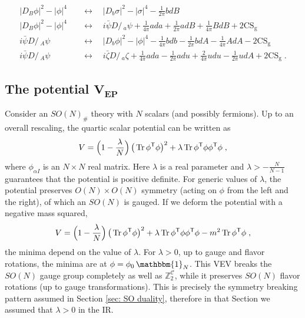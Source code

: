 \documentclass[a4paper, 12pt]{article}
\newcommand{\matht}[1]{\ensuremath{\boldsymbol{#1}}}
\numberwithin{equation}{section}
\newcommand{\Dslash}{D\!\!\!\!\slash\,}
\newcommand{\be}{\begin{equation}} \newcommand{\ee}{\end{equation}}
\newcommand{\cC}{\mathcal{C}}
\newcommand{\bZ}{\mathbb{Z}}
\newcommand{\sT}{{\sf{T}}}
\newcommand{\unit}{\mathbbm{1}}
\DeclareMathOperator{\Tr}{Tr}
\begin{document}
\begin{subequations}
\label{Abelian dualities with background t-rev}
\begin{align}
\label{Abdurev-a}
|D_B\phi|^2 - |\phi|^4 \quad&\longleftrightarrow\quad |D_b\sigma|^2 - |\sigma|^4 - \frac1{2\pi} bdB \\
\label{Abdurev-b}
|D_B\phi|^2 - |\phi|^4 \quad&\longleftrightarrow\quad i \bar\psi \Dslash_a \psi + \frac1{4\pi} ada + \frac1{2\pi} adB + \frac1{4\pi} BdB +2 \text{CS}_\text{g} \\
\label{Abdurev-c}
i\bar\psi \Dslash_A \psi \quad&\longleftrightarrow\quad |D_b\phi|^2 - |\phi|^4 - \frac1{4\pi} bdb - \frac1{2\pi}bdA - \frac1{4\pi} AdA - 2\text{CS}_\text{g} \\
\label{Abdurev-d}
i\bar\psi \Dslash_A \psi \quad&\longleftrightarrow\quad i \bar\zeta \Dslash_a \zeta + \frac1{4\pi} ada - \frac1{2\pi} adu + \frac2{4\pi} udu - \frac1{2\pi} udA + 2\text{CS}_\text{g} \;.
\end{align}
\end{subequations}




\subsection[The potential $V_\text{EP}$]{The potential \matht{V_\text{EP}}}
\label{sec: potential}

Consider an $SO(N)_\#$ theory with $N$ scalars (and possibly fermions). Up to an overall rescaling, the quartic scalar potential can be written as
\be
\label{potential with lambda}
V = \Big( 1 - \frac\lambda N \Big) \, \big( \Tr \phi^\sT \phi \big)^2 + \lambda \Tr \phi^\sT \phi \phi^\sT \phi \;,
\ee
where $\phi_{\alpha I}$ is an $N\times N$ real matrix. Here $\lambda$ is a real parameter and $\lambda > - \frac N{N-1}$ guarantees that the potential is positive definite. For generic values of $\lambda$, the potential preserves $O(N) \times O(N)$ symmetry (acting on $\phi$ from the left and the right), of which an $SO(N)$ is gauged. If we deform the potential with a negative mass squared,
\be
V = \Big( 1 - \frac\lambda N \Big) \, \big( \Tr \phi^\sT \phi \big)^2 + \lambda \Tr \phi^\sT \phi \phi^\sT \phi - m^2 \Tr \phi^\sT \phi \;,
\ee
the minima depend on the value of $\lambda$. For $\lambda>0$, up to gauge and flavor rotations, the minima are at $\phi = \phi_0 \, \unit_N$. This VEV breaks the $SO(N)$ gauge group completely as well as $\bZ_2^\cC$, while it preserves $SO(N)$ flavor rotations (up to gauge transformations). This is precisely the symmetry breaking pattern assumed in Section \ref{sec: SO duality}, therefore in that Section we assumed that $\lambda>0$ in the IR.
\end{document}
